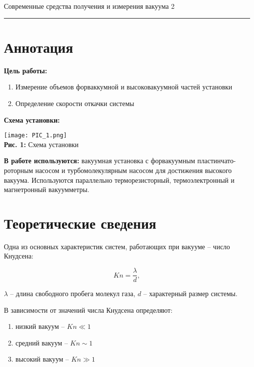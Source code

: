 \documentclass[12pt,a4paper]{scrartcl}
\begin{document}
	
	\begin{flushleft}
		\footnotesize{Современные средства получения и измерения вакуума} \hspace{\fill} \footnotesize{2}
		\\[-0.3cm]\noindent\rule{\textwidth}{0.3pt}
	\end{flushleft}
	
	\section{Аннотация}
	
	\textbf{Цель работы: }
	\begin{enumerate}
		\item Измерение объемов форваккумной и высоковакуумной частей установки
		\item Определение скорости откачки системы
	\end{enumerate}
	
	\textbf{Схема установки:}
	\begin{center}
		\texttt{[image: PIC\_1.png]}
		\\\textbf{Рис. 1:} Схема установки
	\end{center}
	
	\textbf{В работе используются:}
	вакуумная установка с форвакуумным пластинчато-роторным насосом и турбомолекулярным насосом для достижения высокого вакуума. Используются параллельно терморезисторный, термоэлектронный и магнетронный вакуумметры.
	
	\section{Теоретические сведения}
	
	Одна из основных характеристик систем, работающих при вакууме -- число Кнудсена:
	
	\begin{equation}
	Kn = \frac{\lambda}{d}, 
	\end{equation}
	
	$\lambda$ -- длина свободного пробега молекул газа, $d$ -- характерный размер системы.
	
	\medskip
	В зависимости от значений числа Кнудсена определяют:
	\begin{enumerate}
		\item низкий вакуум -- $Kn \ll 1$
		\item средний вакуум -- $Kn \sim 1$
		\item высокий вакуум -- $Kn \gg 1$
	\end{enumerate}
	
\end{document}
